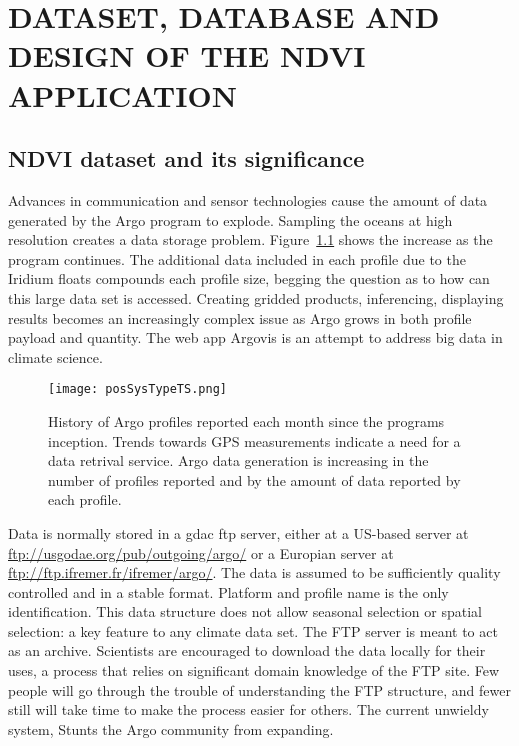 \chapter{DATASET, DATABASE AND DESIGN OF THE NDVI APPLICATION}
\label{chap:argo}

\section{NDVI dataset and its significance}

Advances in communication and sensor technologies cause the amount of data generated by the Argo program to explode. Sampling the oceans at high resolution creates a data storage problem. Figure~\ref{fig:prof_vs_time} shows the increase as the program continues. The additional data included in each profile due to the Iridium floats compounds each profile size, begging the question as to how can this large data set is accessed. Creating gridded products, inferencing, displaying results becomes an increasingly complex issue as Argo grows in both profile payload and quantity. The web app Argovis is an attempt to address big data in climate science.

\begin{figure}[ht]
\centering
\begin{minipage}{6in}
\texttt{[image: posSysTypeTS.png]}
\caption{\label{fig:prof_vs_time} History of Argo profiles reported each month since the programs inception. Trends towards GPS measurements indicate a need for a data retrival service. Argo data generation is increasing in the number of profiles reported and by the amount of data reported by each profile.}
\end{minipage}
\end{figure}

Data is normally stored in a \gls{gdac} \gls{ftp} server, either at a US-based server at \url{ftp://usgodae.org/pub/outgoing/argo/} or a Europian server at \url{ftp://ftp.ifremer.fr/ifremer/argo/}. The data is assumed to be sufficiently quality controlled and in a stable format. Platform and profile name is the only identification. This data structure does not allow seasonal selection or spatial selection: a key feature to any climate data set. The FTP server is meant to act as an archive. Scientists are encouraged to download the data locally for their uses, a process that relies on significant domain knowledge of the FTP site. Few people will go through the trouble of understanding the FTP structure, and fewer still will take time to make the process easier for others. The current unwieldy system, Stunts the Argo community from expanding.

